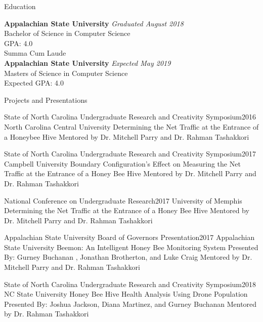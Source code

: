 \documentclass{resume} %
\begin{document}
\begin{rSection}{Education}

{\bf Appalachian State University} \hfill {\em Graduated August 2018} 
\\ Bachelor of Science in Computer Science
\\ GPA: 4.0
\\ Summa Cum Laude
\\{\bf Appalachian State University} \hfill {\em Expected May 2019} 
\\ Masters of Science in Computer Science
\\ Expected GPA: 4.0

\end{rSection}


\begin{rSection}{Projects and Presentations}
\begin{rSubsection}{State of North Carolina Undergraduate Research and Creativity Symposium}{2016}{}{}{}
    North Carolina Central University
    Determining the Net Traffic at the Entrance of a Honeybee Hive
    Mentored by Dr. Mitchell Parry and Dr. Rahman Tashakkori 
\end{rSubsection}
\begin{rSubsection}{State of North Carolina Undergraduate Research and Creativity Symposium}{2017}{}{}{}
    Campbell University
    Boundary Configuration's Effect on Measuring the Net Traffic at the Entrance of a Honey Bee Hive
    Mentored by Dr. Mitchell Parry and Dr. Rahman Tashakkori 
\end{rSubsection}
\begin{rSubsection}{National Conference on Undergraduate Research}{2017}{}{}{}
    University of Memphis
    Determining the Net Traffic at the Entrance of a Honey Bee Hive
    Mentored by Dr. Mitchell Parry and Dr. Rahman Tashakkori 
\end{rSubsection}
\begin{rSubsection}{Appalachian State University Board of Governors Presentation}{2017}{}{}{}
    Appalachian State University
    Beemon: An Intelligent Honey Bee Monitoring System
    Presented By: Gurney Buchanan , Jonathan Brotherton, and Luke Craig
    Mentored by Dr. Mitchell Parry and Dr. Rahman Tashakkori 
\end{rSubsection}
\begin{rSubsection}{State of North Carolina Undergraduate Research and Creativity Symposium}{2018}{}{}{}
    NC State University
    Honey Bee Hive Health Analysis Using Drone Population
    Presented By: Joshua Jackson, Diana Martinez, and Gurney Buchanan
    Mentored by Dr. Rahman Tashakkori 
\end{rSubsection}
\end{rSection}
\end{document}
